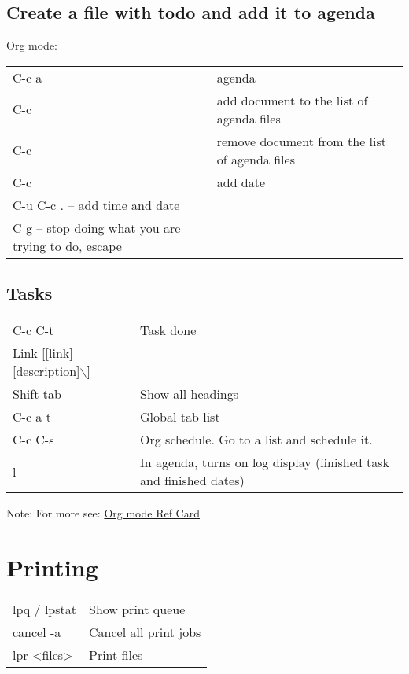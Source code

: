 \documentclass[11pt]{article}
\begin{document}
\subsection{Create a file with todo and add it to agenda}
\label{sec:org7cf8632}
Org mode:\\
\begin{center}
\begin{tabular}{ll}
\hline
C-c a & agenda\\
C-c & add document to the list of agenda files\\
C-c & remove document from the list of agenda files\\
C-c & add date\\
C-u C-c . – add time and date & \\
C-g – stop doing what you are trying to do, escape & \\
\end{tabular}
\end{center}

\subsection{Tasks}
\label{sec:org4248eaf}

\begin{center}
\begin{tabular}{ll}
C-c C-t & Task done\\
Link [[link][description]$\backslash$] & \\
Shift tab & Show all headings\\
C-c a t & Global tab list\\
C-c C-s & Org schedule. Go to a list and schedule it.\\
l & In agenda, turns on log display (finished task and finished dates)\\
\end{tabular}
\end{center}




Note: For more see: \href{orgcard.pdf}{Org mode Ref Card}\\

\section{Printing}
\label{sec:org3e35710}
\begin{center}
\begin{tabular}{ll}
\hline
lpq / lpstat & Show print queue\\
cancel -a & Cancel all print jobs\\
lpr <files> & Print files\\
\hline
\end{tabular}
\end{center}
\end{document}
